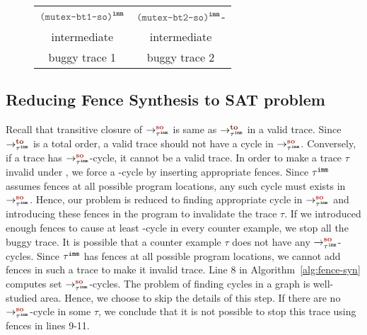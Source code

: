 \begin{figure}[!h]
	\begin{tabular}{|c|c|}
		\hline
		\resizebox{0.24\textwidth}{!}{} &
		\resizebox{0.24\textwidth}{!}{} \\
		\hline
		
		\multicolumn{1}{c}{$\imm{\hl{mutex-bt1-so}}$}  &
		\multicolumn{1}{c}{$\imm{\hl{mutex-bt2-so}}$-} \\
		
		\multicolumn{1}{c}{intermediate} &
		\multicolumn{1}{c}{intermediate} \\
		
		\multicolumn{1}{c}{buggy trace 1} &
		\multicolumn{1}{c}{buggy trace 2} \\
	\end{tabular}
\end{figure}


\subsection{Reducing Fence Synthesis to SAT problem}
Recall that transitive closure of $ \so{\imm{\tau}}{}{} $ is same as 
$ \to{\imm{\tau}}{}{} $ in a valid \cc trace. Since  
$ \to{\imm{\tau}}{}{} $ is a total order, a valid \cc trace should not 
have a cycle in $ \so{\imm{\tau}}{}{} $. Conversely, if a trace has 
$ \so{\imm{\tau}}{}{} $-cycle, it cannot be a valid \cc trace. 
In order to make a trace $ \tau $ invalid under \cc, we force a \lso-cycle by inserting appropriate fences. 
Since $ {\tau}^{\mathtt{imm}} $ assumes \mosc fences at all possible program locations,
any such cycle must exists in $ \so{\imm{\tau}}{}{} $. 
Hence, our problem is reduced to finding appropriate cycle in 
$\so{\imm{\tau}}{}{} $ and introducing these fences in the program to 
invalidate the trace $ \tau $.
If we introduced enough fences to cause at least \lso-cycle in 
every counter example, we stop all the buggy trace. 
It is possible that a counter example $ \tau $ does not have any 
$\so{\imm{\tau}}{}{}$-cycles. Since $ {\tau}^{\mathtt{imm}} $ has \mosc fences at all 
possible program locations, we cannot add fences in such a trace to 
make it invalid \cc trace. 
Line 8 in Algorithm~\ref{alg:fence-syn} computes set $\so{\imm{\tau}}{}{}$-cycles. 
The problem of finding cycles in a graph is well-studied area. Hence, we 
choose to skip the details of this step.
If there are no $\so{\imm{\tau}}{}{}$-cycle in some $ \tau $, we conclude 
that it is not possible to stop this trace using \cc fences in lines 
9-11.


